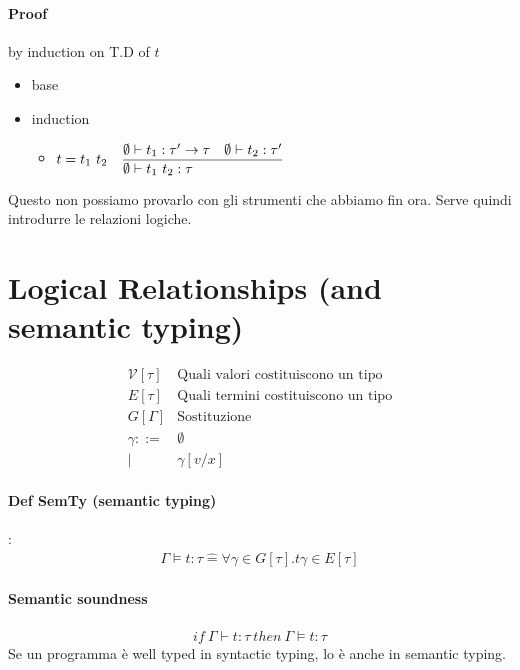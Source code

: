 \documentclass{article}
\newcommand{\st}[3][]{\ensuremath \displaystyle\frac{#3\hfill}{#2\hfill} \text{#1}}
\newcommand{\V}{\ensuremath{\mathcal{V}}}
\begin{document}
\paragraph{Proof} by induction on T.D of $t$ \\
\begin{itemize}
    \item base 
    \item induction \begin{itemize}
            \item $t=t_1\ t_2\quad \st{\emptyset\vdash t_1\ t_2:\tau}{\emptyset\vdash t_1:\tau'\to\tau\quad\emptyset\vdash t_2:\tau'}$
        \end{itemize}
\end{itemize}
Questo non possiamo provarlo con gli strumenti che abbiamo fin ora. Serve quindi introdurre le relazioni logiche.

\section{Logical Relationships (and semantic typing)}
\begin{align*}
    \V\left[\tau\right] & \text{Quali valori costituiscono un tipo} \\
    E\left[\tau\right] & \text{Quali termini costituiscono un tipo}\\
    G\left[\Gamma\right] & \text{Sostituzione} \\
    \gamma ::=&\emptyset \\
    |&\gamma[v/x] 
\end{align*}

\paragraph{Def SemTy (semantic typing)}: \begin{align*}
    \Gamma \vDash t:\tau \hat{=} \forall \gamma\in G[\tau].t\gamma\in E[\tau] 
\end{align*}

\paragraph{Semantic soundness}
\begin{align*}
    if\ \Gamma\vdash t:\tau\ then\ \Gamma \vDash t:\tau
\end{align*}
Se un programma è well typed in syntactic typing, lo è anche in semantic typing.
\end{document}
